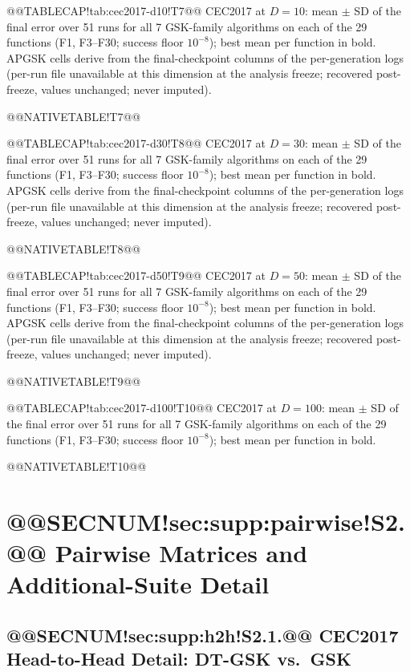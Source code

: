 \documentclass[10pt,a4paper]{article}
\newcommand{\dtgsk}{DT-GSK}
\newcommand{\apgsk}{APGSK}
\begin{document}
@@TABLECAP!tab:cec2017-d10!T7@@ CEC2017 at $D = 10$: mean $\pm$ SD of the final error over 51
runs for all 7 GSK-family algorithms on each of the 29 functions (F1,
F3--F30; success floor $10^{-8}$); best mean per function in bold.
  \apgsk{} cells
derive from the final-checkpoint columns of the per-generation logs
(per-run file unavailable at this dimension at the analysis freeze;
recovered post-freeze, values unchanged; never
imputed).

@@NATIVETABLE!T7@@





@@TABLECAP!tab:cec2017-d30!T8@@ CEC2017 at $D = 30$: mean $\pm$ SD of the final error over 51
runs for all 7 GSK-family algorithms on each of the 29 functions (F1,
F3--F30; success floor $10^{-8}$); best mean per function in bold.
  \apgsk{} cells
derive from the final-checkpoint columns of the per-generation logs
(per-run file unavailable at this dimension at the analysis freeze;
recovered post-freeze, values unchanged; never
imputed).

@@NATIVETABLE!T8@@





@@TABLECAP!tab:cec2017-d50!T9@@ CEC2017 at $D = 50$: mean $\pm$ SD of the final error over 51
runs for all 7 GSK-family algorithms on each of the 29 functions (F1,
F3--F30; success floor $10^{-8}$); best mean per function in bold.
  \apgsk{} cells
derive from the final-checkpoint columns of the per-generation logs
(per-run file unavailable at this dimension at the analysis freeze;
recovered post-freeze, values unchanged; never
imputed).

@@NATIVETABLE!T9@@





@@TABLECAP!tab:cec2017-d100!T10@@ CEC2017 at $D = 100$: mean $\pm$ SD of the final error over 51
runs for all 7 GSK-family algorithms on each of the 29 functions (F1,
F3--F30; success floor $10^{-8}$); best mean per function in bold.

@@NATIVETABLE!T10@@




\section{@@SECNUM!sec:supp:pairwise!S2.@@ Pairwise Matrices and Additional-Suite Detail}\label{sec:supp:pairwise}


\subsection{@@SECNUM!sec:supp:h2h!S2.1.@@ CEC2017 Head-to-Head Detail: \dtgsk{} vs.\ GSK}\label{sec:supp:h2h}
\end{document}

